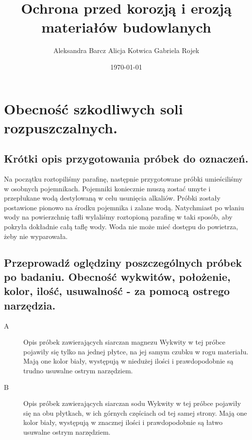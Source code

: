 


\title{Ochrona przed korozją i erozją materiałów budowlanych}
\author{Aleksandra Barcz \newline Alicja Kotwica \newline Gabriela Rojek}
\date{\today}




\maketitle
{
\setcounter{tocdepth}{3}
\newpage
{} 
}

\section{Obecność szkodliwych soli rozpuszczalnych.}

\subsection{Krótki opis przygotowania próbek do oznaczeń.}

Na początku roztopiliśmy parafinę, następnie przygotowane próbki umieściliśmy w osobnych pojemnikach. Pojemniki koniecznie muszą zostać umyte i przepłukane wodą destylowaną w celu usunięcia alkaliów. Próbki zostały postawione pionowo na środku pojemnika i zalane wodą. Natychmiast po wlaniu wody na powierzchnię tafli wylaliśmy roztopioną parafinę w taki sposób, aby pokryła dokładnie całą taflę wody. Woda nie może mieć dostępu do powietrza, żeby nie wyparowała.

\subsection{Przeprowadź oględziny poszczególnych próbek po badaniu. Obecność wykwitów, położenie, kolor, ilość, usuwalność - za pomocą ostrego narzędzia.}

\begin{description}
    \item[A] Opis próbek zawierających siarczan magnezu
    \newline
    \newline
    Wykwity w tej próbce pojawiły się tylko na jednej płytce, na jej samym czubku w rogu materiału. Mają one kolor biały, występują w niedużej ilości i prawdopodobnie są trudno usuwalne ostrym narzędziem.
    \item[B] Opis próbek zawierających siarczan sodu 
    \newline
    \newline
    Wykwity w tej próbce pojawiły się na obu płytkach, w ich górnych częściach od tej samej strony. Mają one kolor biały, występują w znacznej ilości i prawdopodobnie są łatwo usuwalne ostrym narzędziem.
\end{description}


